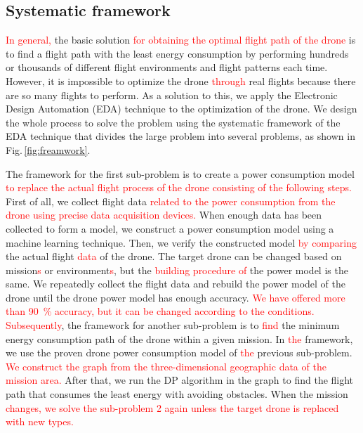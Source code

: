 \documentclass[journal]{./template/IEEEtran}
\begin{document}
\subsection {Systematic framework}

\textcolor{red}{In general,} the basic solution \textcolor{red}{for obtaining the optimal flight path of the drone} is to find a flight path with the least energy consumption by performing hundreds or thousands of different flight environments and flight patterns each time.
However, it is impossible to optimize the drone \textcolor{red}{through} real flights because there are so many flights to perform.
As a solution to this, we apply the Electronic Design Automation (EDA) technique to the optimization of the drone.
We design the whole process to solve the problem using the systematic framework of the EDA technique that divides the large problem into several problems, as shown in Fig.\,\ref{fig:freamwork}.

The framework for the first sub-problem is to create a power consumption model \textcolor{red}{to replace the actual flight process of the drone consisting of the following steps.}
First of all, we collect flight data \textcolor{red}{related to the power consumption from the drone using precise data acquisition devices.}
When enough data has been collected to form a model, we construct a power consumption model using a machine learning technique.
Then, we verify the constructed model \textcolor{red}{by comparing} the actual flight \textcolor{red}{data} of the drone.
The target drone can be changed based on mission\textcolor{red}{s} or environment\textcolor{red}{s}, but the \textcolor{red}{building procedure of} the power model is the same. 
We repeatedly collect the flight data and rebuild the power model of the drone until the drone power model has enough accuracy.  
\textcolor{red}{We have offered more than 90~\% accuracy, but it can be changed according to the conditions.}
\textcolor{red}{Subsequently}, the framework for another sub-problem is to \textcolor{red}{find} the minimum energy consumption path of the drone within a given mission. 
In \textcolor{red}{the} framework, we use the proven drone power consumption model of \textcolor{red}{the} previous sub-problem.
\textcolor{red}{We construct the graph from the three-dimensional geographic data of the mission area.} After that, we run the DP algorithm in the graph to find the flight path that consumes the least energy with avoiding obstacles. 
When the mission \textcolor{red}{changes, we solve the sub-problem 2 again unless the target drone is replaced with new types.}
\end{document}
